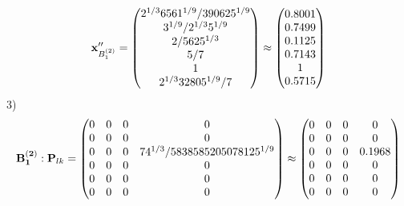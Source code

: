 \documentclass[10pt,a4paper]{article}
\begin{document}
	\[
		\bold{x}''_{B_1^{(2)}} = 
		\begin{pmatrix}
			{{2^ {1 / 3}}{6561^ {1 / 9}}} / {{390625^ {1 / 9}}} \\
			{{3^ {1 / 9}}} / {{2^ {1 / 3}}{5^ {1 / 9}}} \\
			{{2}} / {{5625^ {1 / 3}}} \\
			{{5}} / {{7}} \\
			{1}{} \\
			{{2^ {1 / 3}}{32805^ {1 / 9}}} / {{7}} \\
		\end{pmatrix}
		\approx
		\begin{pmatrix}
			0.8001   \\
			0.7499   \\
			0.1125   \\
			0.7143   \\
			1        \\
			0.5715   \\
		\end{pmatrix}
	\]
	3)
	\[
		\bold{B_1^{(2)}}: \bold{P}_{lk} = 
		\begin{pmatrix}
			{{0}}{} & {{0}}{} & {{0}}{} & {{0}}{} \\
			{{0}}{} & {{0}}{} & {{0}}{} & {{0}}{} \\
			{{0}}{} & {{0}}{} & {{0}}{} & {{7}{4^ {1 / 3}}} / {{5838585205078125^ {1 / 9}}} \\
			{{0}}{} & {{0}}{} & {{0}}{} & {{0}}{} \\
			{{0}}{} & {{0}}{} & {{0}}{} & {{0}}{} \\
			{{0}}{} & {{0}}{} & {{0}}{} & {{0}}{} \\
		\end{pmatrix}
		\approx
		\begin{pmatrix}
			0        & 0        & 0        & 0        \\
			0        & 0        & 0        & 0        \\
			0        & 0        & 0        & 0.1968   \\
			0        & 0        & 0        & 0        \\
			0        & 0        & 0        & 0        \\
			0        & 0        & 0        & 0        \\
		\end{pmatrix}
	\]
\end{document}
